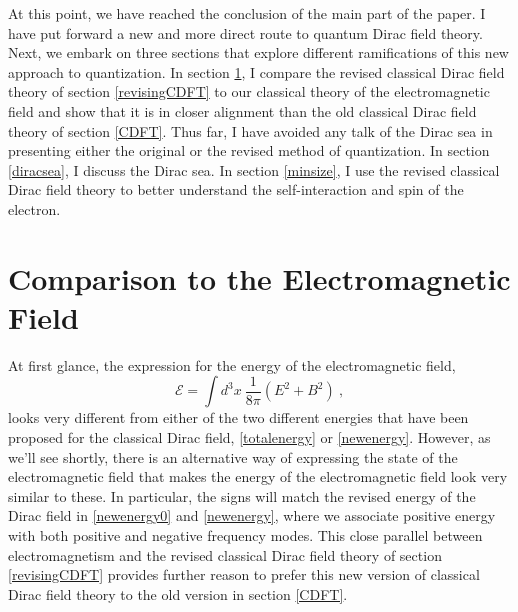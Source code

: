 \documentclass[onecolumn,secnumarabic,amsmath,amssymb,balancelastpage,nofootinbib]{article}
\begin{document}
At this point, we have reached the conclusion of the main part of the paper.  I have put forward a new and more direct route to quantum Dirac field theory.  Next, we embark on three sections that explore different ramifications of this new approach to quantization.  In section \ref{comparisontoEM}, I compare the revised classical Dirac field theory of section \ref{revisingCDFT} to our classical theory of the electromagnetic field and show that it is in closer alignment than the old classical Dirac field theory of section \ref{CDFT}.  Thus far, I have avoided any talk of the Dirac sea in presenting either the original or the revised method of quantization.  In section \ref{diracsea}, I discuss the Dirac sea.  In section \ref{minsize}, I use the revised classical Dirac field theory to better understand the self-interaction and spin of the electron.









\section{Comparison to the Electromagnetic Field}\label{comparisontoEM}

At first glance, the expression for the energy of the electromagnetic field,
\begin{equation}
\mathcal{E}=\int{d^3 x \ \frac{1}{8\pi}(E^2 + B^2)}
\ ,
\label{EMfieldenergy}
\end{equation}
looks very different from either of the two different energies that have been proposed for the classical Dirac field, \eqref{totalenergy} or \eqref{newenergy}.  However, as we'll see shortly, there is an alternative way of expressing the state of the electromagnetic field that makes the energy of the electromagnetic field look very similar to these.  In particular, the signs will match the revised energy of the Dirac field in \eqref{newenergy0} and \eqref{newenergy}, where we associate positive energy with both positive and negative frequency modes.  This close parallel between electromagnetism and the revised classical Dirac field theory of section \ref{revisingCDFT} provides further reason to prefer this new version of classical Dirac field theory to the old version in section \ref{CDFT}.
\end{document}
